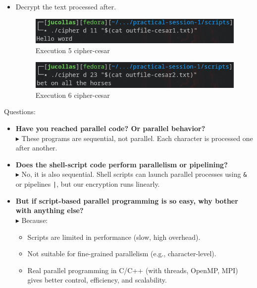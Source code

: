 \documentclass[12pt]{article}
\begin{document}
\begin{itemize}
    \item Decrypt the text processed after.
    \begin{figure}[H]
        \centering
        \includegraphics[width=0.8\linewidth]{images/cipher-execute5.png}
        \caption{Execution 5 cipher-cesar}
    \end{figure}

    \begin{figure}[H]
        \centering
        \includegraphics[width=0.8\linewidth]{images/cipher-execute6.png}
        \caption{Execution 6 cipher-cesar}
    \end{figure}
\end{itemize}

\newpage

Questions:
\begin{itemize}
    \item \textbf{Have you reached parallel code? Or parallel behavior?} \\
    \(\blacktriangleright\) These programs are sequential, not parallel. Each character is processed one after another.

    \item \textbf{Does the shell-script code perform parallelism or pipelining?} \\
    \(\blacktriangleright\) No, it is also sequential. Shell scripts can launch parallel processes using \texttt{\&} or pipelines \texttt{|}, but our encryption runs linearly.

    \item \textbf{But if script-based parallel programming is so easy, why bother with anything else?} \\ 
    \(\blacktriangleright\) Because:
    \begin{itemize}
        \item Scripts are limited in performance (slow, high overhead).
        \item Not suitable for fine-grained parallelism (e.g., character-level).
        \item Real parallel programming in C/C++ (with threads, OpenMP, MPI) gives better control, efficiency, and scalability.
    \end{itemize}
\end{itemize}
\end{document}
